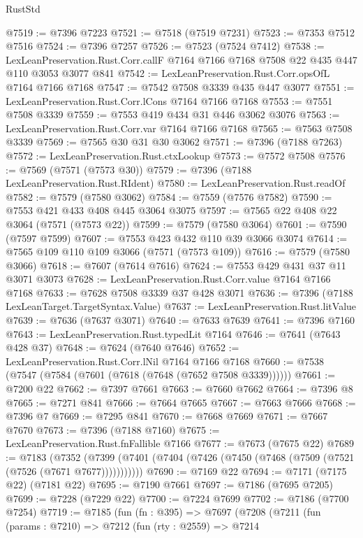 \begin{lexlean}{RustStd}
\begin{coremodule}
@7519 := @7396 @7223
@7521 := @7518 (@7519 @7231)
@7523 := @7353 @7512 @7516
@7524 := @7396 @7257
@7526 := @7523 (@7524 @7412)
@7538 := LexLeanPreservation.Rust.Corr.callF
    @7164
    @7166
    @7168
    @7508
    @22
    @435
    @447
    @110
    @3053
    @3077
    @841
@7542 := LexLeanPreservation.Rust.Corr.opsOfL @7164 @7166 @7168
@7547 := @7542 @7508 @3339 @435 @447 @3077
@7551 := LexLeanPreservation.Rust.Corr.lCons @7164 @7166 @7168
@7553 := @7551 @7508 @3339
@7559 := @7553 @419 @434 @31 @446 @3062 @3076
@7563 := LexLeanPreservation.Rust.Corr.var @7164 @7166 @7168
@7565 := @7563 @7508 @3339
@7569 := @7565 @30 @31 @30 @3062
@7571 := @7396 (@7188 @7263)
@7572 := LexLeanPreservation.Rust.ctxLookup
@7573 := @7572 @7508
@7576 := @7569 (@7571 (@7573 @30))
@7579 := @7396 (@7188 LexLeanPreservation.Rust.RIdent)
@7580 := LexLeanPreservation.Rust.readOf
@7582 := @7579 (@7580 @3062)
@7584 := @7559 (@7576 @7582)
@7590 := @7553 @421 @433 @408 @445 @3064 @3075
@7597 := @7565 @22 @408 @22 @3064 (@7571 (@7573 @22))
@7599 := @7579 (@7580 @3064)
@7601 := @7590 (@7597 @7599)
@7607 := @7553 @423 @432 @110 @39 @3066 @3074
@7614 := @7565 @109 @110 @109 @3066 (@7571 (@7573 @109))
@7616 := @7579 (@7580 @3066)
@7618 := @7607 (@7614 @7616)
@7624 := @7553 @429 @431 @37 @11 @3071 @3073
@7628 := LexLeanPreservation.Rust.Corr.value @7164 @7166 @7168
@7633 := @7628 @7508 @3339 @37 @428 @3071
@7636 := @7396 (@7188 LexLeanTarget.TargetSyntax.Value)
@7637 := LexLeanPreservation.Rust.litValue
@7639 := @7636 (@7637 @3071)
@7640 := @7633 @7639
@7641 := @7396 @7160
@7643 := LexLeanPreservation.Rust.typedLit @7164
@7646 := @7641 (@7643 @428 @37)
@7648 := @7624 (@7640 @7646)
@7652 := LexLeanPreservation.Rust.Corr.lNil @7164 @7166 @7168
@7660 := @7538 (@7547 (@7584 (@7601 (@7618 (@7648 (@7652 @7508 @3339))))))
@7661 := @7200 @22
@7662 := @7397 @7661
@7663 := @7660 @7662
@7664 := @7396 @8
@7665 := @7271 @841
@7666 := @7664 @7665
@7667 := @7663 @7666
@7668 := @7396 @7
@7669 := @7295 @841
@7670 := @7668 @7669
@7671 := @7667 @7670
@7673 := @7396 (@7188 @7160)
@7675 := LexLeanPreservation.Rust.fnFallible @7166
@7677 := @7673 (@7675 @22)
@7689 := @7183
    (@7352 (@7399 (@7401 (@7404 (@7426 (@7450 (@7468 (@7509 (@7521 (@7526 (@7671 @7677)))))))))))
@7690 := @7169 @22
@7694 := @7171 (@7175 @22) (@7181 @22)
@7695 := @7190 @7661
@7697 := @7186 (@7695 @7205)
@7699 := @7228 (@7229 @22)
@7700 := @7224 @7699
@7702 := @7186 (@7700 @7254)
@7719 := @7185
    (fun (fn : @395) =>
    @7697
      (@7208
        (@7211
          (fun (params : @7210) =>
          @7212
            (fun (rty : @2559) =>
            @7214

\end{coremodule}
\end{lexlean}
